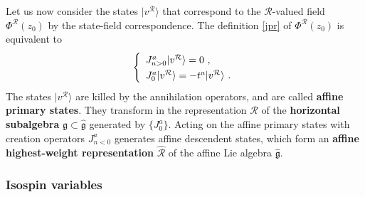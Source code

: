 \documentclass[12pt, a4paper, notitlepage, twoside]{report}
\numberwithin{equation}{section}
\theoremstyle{break}
\begin{document}
Let us now consider the states $|v^\mathcal{R}\rangle$ that correspond to the $\mathcal{R}$-valued field $\Phi^\mathcal{R}(z_0)$ by the state-field correspondence.
The definition \eqref{jpr} of $\Phi^\mathcal{R}(z_0)$ is equivalent to 
\begin{align}
\renewcommand{\arraystretch}{1.3}
 \left\{\begin{array}{l}  J^a_{n>0}|v^\mathcal{R}\rangle = 0 \ ,  \\ J^a_0|v^\mathcal{R}\rangle = -t^a |v^\mathcal{R}\rangle\ . \end{array}\right. 
\end{align}
The states $|v^\mathcal{R}\rangle$ are killed by the annihilation operators, and are called \textbf{\boldmath affine primary states}.
They transform in the representation $\mathcal{R}$ of the \textbf{\boldmath horizontal subalgebra} $\mathfrak{g}\subset \hat{\mathfrak{g}}$ generated by $\{J^a_0\}$.
Acting on the affine primary states with creation operators $J^a_{n<0}$ generates affine descendent states, which form an \textbf{\boldmath affine highest-weight representation} $\hat{\mathcal{R}}$ of the affine Lie algebra $\hat{\mathfrak{g}}$.

\subsubsection{Isospin variables}
\end{document}
